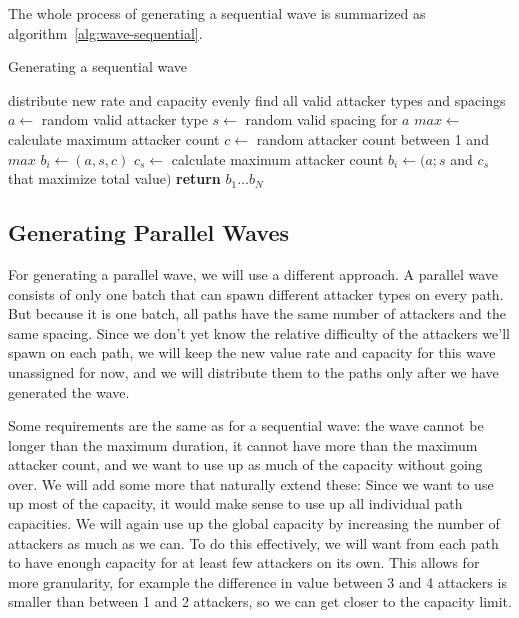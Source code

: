 The whole process of generating a sequential wave is summarized as algorithm~\ref{alg:wave-sequential}.

\begin{algorithm}[H]
    \caption{Generating a sequential wave}
    \label{alg:wave-sequential}
    \begin{algorithmic}[1]
        \State distribute new rate and capacity evenly
        \Statex
        \State find all valid attacker types and spacings
        \State $a \gets$ random valid attacker type
        \Statex
        \State $s \gets$ random valid spacing for $a$
        \State $max \gets$ calculate maximum attacker count
        \State $c \gets$ random attacker count between 1 and $max$
        \State $b_i \gets (a,s,c)$
        \Statex
        \Else
        \State $c_s \gets$ calculate maximum attacker count
        \EndFor
        \State $b_i \gets (a; s$ and $c_s$ that maximize total value$)$
        \EndIf
        \EndFor
        \State \textbf{return} $b_1 \dots b_N$
        \Statex
    \end{algorithmic}
\end{algorithm}

\subsection{Generating Parallel Waves}

For generating a parallel wave, we will use a different approach.
A parallel wave consists of only one batch that can spawn different attacker types on every path.
But because it is one batch, all paths have the same number of attackers and the same spacing.
Since we don't yet know the relative difficulty of the attackers we'll spawn on each path, we will keep the new value rate and capacity for this wave unassigned for now, and we will distribute them to the paths only after we have generated the wave.

Some requirements are the same as for a sequential wave: the wave cannot be longer than the maximum duration, it cannot have more than the maximum attacker count, and we want to use up as much of the capacity without going over.
We will add some more that naturally extend these:
Since we want to use up most of the capacity, it would make sense to use up all individual path capacities.
We will again use up the global capacity by increasing the number of attackers as much as we can.
To do this effectively, we will want from each path to have enough capacity for at least few attackers on its own.
This allows for more granularity, for example the difference in value between 3 and 4 attackers is smaller than between 1 and 2 attackers, so we can get closer to the capacity limit.

